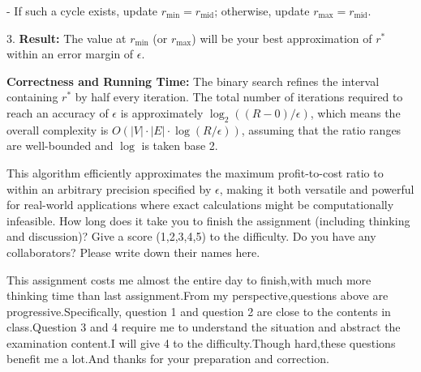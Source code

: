 \documentclass{oxmathproblems}
\begin{document}
\begin{questions}
   - If such a cycle exists, update $r_{\text{min}} = r_{\text{mid}}$; otherwise, update $r_{\text{max}} = r_{\text{mid}}$.

3. \textbf{Result:} The value at $r_{\text{min}}$ (or $r_{\text{max}}$) will be your best approximation of $r^*$ within an error margin of $\epsilon$.

\textbf{Correctness and Running Time:}
The binary search refines the interval containing $r^*$ by half every iteration. The total number of iterations required to reach an accuracy of $\epsilon$ is approximately $\log_2((R-0)/\epsilon)$, which means the overall complexity is $O(|V| \cdot |E| \cdot \log(R/\epsilon))$, assuming that the ratio ranges are well-bounded and $\log$ is taken base 2.

This algorithm efficiently approximates the maximum profit-to-cost ratio to within an arbitrary precision specified by $\epsilon$, making it both versatile and powerful for real-world applications where exact calculations might be computationally infeasible.
\miquestion
How long does it take you to finish the assignment (including thinking and discussion)?
Give a score (1,2,3,4,5) to the difficulty.
Do you have any collaborators?
Please write down their names here.

This assignment costs me almost the entire day to
finish,with much more thinking time than last assignment.From my perspective,questions above are progressive.Specifically,
question 1 and question 2 are close to the contents in class.Question 3 and 4  require me to understand the situation and abstract the examination content.I will give 4 to the difficulty.Though hard,these questions benefit me a lot.And thanks for your preparation and correction.

\end{questions}
\end{document}
